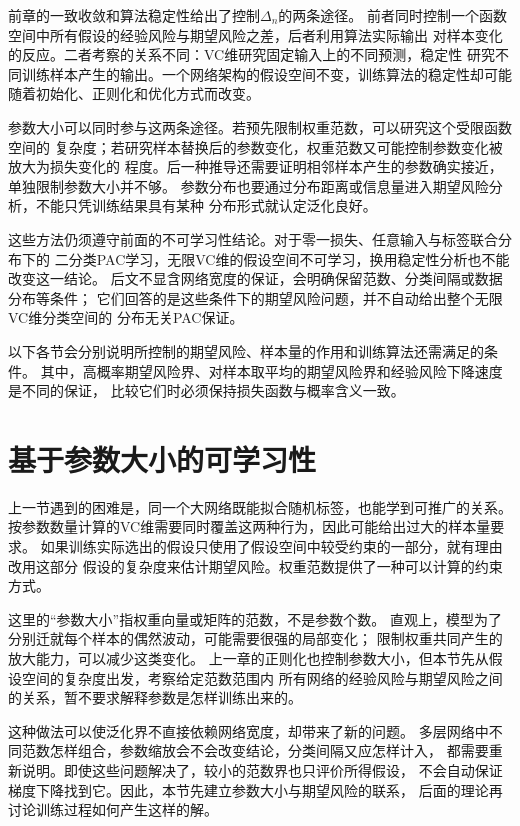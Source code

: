 前章的一致收敛和算法稳定性给出了控制$\Delta_n$的两条途径。
前者同时控制一个函数空间中所有假设的经验风险与期望风险之差，后者利用算法实际输出
对样本变化的反应。二者考察的关系不同：VC维研究固定输入上的不同预测，稳定性
研究不同训练样本产生的输出。一个网络架构的假设空间不变，训练算法的稳定性却可能
随着初始化、正则化和优化方式而改变。

参数大小可以同时参与这两条途径。若预先限制权重范数，可以研究这个受限函数空间的
复杂度；若研究样本替换后的参数变化，权重范数又可能控制参数变化被放大为损失变化的
程度。后一种推导还需要证明相邻样本产生的参数确实接近，单独限制参数大小并不够。
参数分布也要通过分布距离或信息量进入期望风险分析，不能只凭训练结果具有某种
分布形式就认定泛化良好。

这些方法仍须遵守前面的不可学习性结论。对于零一损失、任意输入与标签联合分布下的
二分类PAC学习，无限VC维的假设空间不可学习，换用稳定性分析也不能改变这一结论。
后文不显含网络宽度的保证，会明确保留范数、分类间隔或数据分布等条件；
它们回答的是这些条件下的期望风险问题，并不自动给出整个无限VC维分类空间的
分布无关PAC保证。

以下各节会分别说明所控制的期望风险、样本量的作用和训练算法还需满足的条件。
其中，高概率期望风险界、对样本取平均的期望风险界和经验风险下降速度是不同的保证，
比较它们时必须保持损失函数与概率含义一致。

\section{基于参数大小的可学习性}
\label{sec:network-norm-bounds}

上一节遇到的困难是，同一个大网络既能拟合随机标签，也能学到可推广的关系。
按参数数量计算的VC维需要同时覆盖这两种行为，因此可能给出过大的样本量要求。
如果训练实际选出的假设只使用了假设空间中较受约束的一部分，就有理由改用这部分
假设的复杂度来估计期望风险。权重范数提供了一种可以计算的约束方式。

这里的“参数大小”指权重向量或矩阵的范数，不是参数个数。
直观上，模型为了分别迁就每个样本的偶然波动，可能需要很强的局部变化；
限制权重共同产生的放大能力，可以减少这类变化。
上一章的正则化也控制参数大小，但本节先从假设空间的复杂度出发，考察给定范数范围内
所有网络的经验风险与期望风险之间的关系，暂不要求解释参数是怎样训练出来的。

这种做法可以使泛化界不直接依赖网络宽度，却带来了新的问题。
多层网络中不同范数怎样组合，参数缩放会不会改变结论，分类间隔又应怎样计入，
都需要重新说明。即使这些问题解决了，较小的范数界也只评价所得假设，
不会自动保证梯度下降找到它。因此，本节先建立参数大小与期望风险的联系，
后面的理论再讨论训练过程如何产生这样的解。

